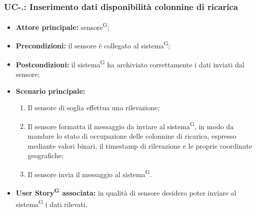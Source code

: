 \documentclass[8pt]{article}
\newcommand{\glossterm}[1]{#1\textsuperscript{G}} %
\begin{document}
\subsubsection*{UC-\theuc .\speconenumber: Inserimento dati disponibilità colonnine di ricarica}
\begin{itemize}
    \item \textbf{Attore principale:} \glossterm{sensore};
    \item \textbf{Precondizioni:} il sensore è collegato al \glossterm{sistema};
    \item \textbf{Postcondizioni:} il \glossterm{sistema} ha archiviato correttamente i dati inviati dal sensore;
    \item \textbf{Scenario principale:}
        \begin{enumerate}
        \item Il sensore di soglia effettua una rilevazione;
        \item Il sensore formatta il messaggio da inviare al \glossterm{sistema}, in modo da mandare lo stato di occupazione delle colonnine di ricarica, espresso mediante valori binari, il timestamp di rilevazione e le proprie coordinate geografiche;
        \item Il sensore invia il messaggio al \glossterm{sistema}.
        \end{enumerate}
    \item \textbf{\glossterm{User Story} associata:} in qualità di sensore desidero poter inviare al \glossterm{sistema} i dati rilevati.
\end{itemize}
\end{document}

